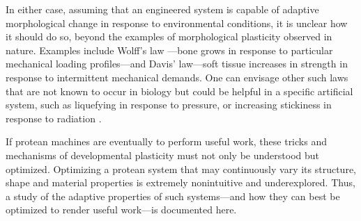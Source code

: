 In either case, assuming that an engineered system is capable of adaptive morphological change in response to environmental conditions, it is unclear how it should do so, beyond the examples of morphological plasticity observed in nature. 
Examples include Wolff's law \cite{ruff2006s}---bone grows in response to particular mechanical loading profiles---and Davis' law---soft tissue increases in strength in response to intermittent mechanical demands.
One can envisage other such laws that are not known to occur in biology but could be helpful in a specific artificial system, 
such as 
liquefying
in response to pressure, or
increasing stickiness in response to radiation \cite{nasa1970radiation}.


If protean machines are eventually to perform useful work, 
these tricks and mechanisms
of developmental plasticity 
must not only be understood but optimized.
Optimizing a protean system that may 
continuously vary its structure, shape and material properties
is extremely nonintuitive and underexplored.
Thus, a study of the adaptive properties of such systems---and how they can best be optimized to render useful work---is documented here. 



